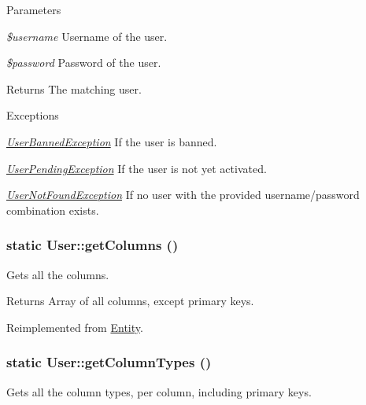 \begin{DoxyParams}{Parameters}
\item[{\em \$username}]Username of the user. \item[{\em \$password}]Password of the user.\end{DoxyParams}
\begin{DoxyReturn}{Returns}
The matching user.
\end{DoxyReturn}

\begin{DoxyExceptions}{Exceptions}
\item[{\em \hyperlink{classUserBannedException}{UserBannedException}}]If the user is banned. \item[{\em \hyperlink{classUserPendingException}{UserPendingException}}]If the user is not yet activated. \item[{\em \hyperlink{classUserNotFoundException}{UserNotFoundException}}]If no user with the provided username/password combination exists. \end{DoxyExceptions}
\hypertarget{classUser_a3a4c51317d99ac96fb282cf2ca3c15c9}{
\subsubsection[{getColumns}]{\setlength{\rightskip}{0pt plus 5cm}static User::getColumns ()}}
\label{classUser_a3a4c51317d99ac96fb282cf2ca3c15c9}
Gets all the columns.

\begin{DoxyReturn}{Returns}
Array of all columns, except primary keys. 
\end{DoxyReturn}


Reimplemented from \hyperlink{classEntity_a394717a08ffd54ec9a14d06727c86719}{Entity}.

\hypertarget{classUser_a2b6212bf34a2be45394c9a0a1220855c}{
\subsubsection[{getColumnTypes}]{\setlength{\rightskip}{0pt plus 5cm}static User::getColumnTypes ()}}
\label{classUser_a2b6212bf34a2be45394c9a0a1220855c}
Gets all the column types, per column, including primary keys.


